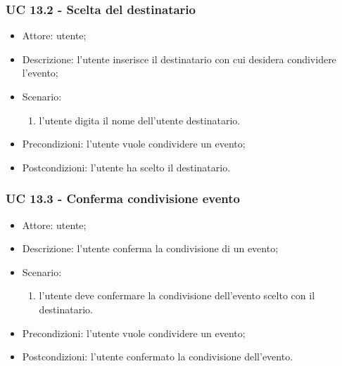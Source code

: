 \subsubsection{UC 13.2 - Scelta del destinatario} \label{sec: UC 13.2}
\begin{itemize}
    \item Attore: utente;
    \item Descrizione: l'utente inserisce il destinatario con cui desidera condividere l'evento;
    \item Scenario:
        \begin{enumerate}
        \item l'utente digita il nome dell'utente destinatario.
        \end{enumerate}
    
    \item Precondizioni: l'utente vuole condividere un evento;
    \item Postcondizioni: l'utente ha scelto il destinatario.
\end{itemize}


\subsubsection{UC 13.3 - Conferma condivisione evento} \label{sec: UC 13.3}
\begin{itemize}
    \item Attore: utente;
    \item Descrizione: l'utente conferma la condivisione di un evento;
    \item Scenario:
        \begin{enumerate}
        \item l'utente deve confermare la condivisione dell'evento scelto con il destinatario.
        \end{enumerate}
    
    \item Precondizioni: l'utente vuole condividere un evento;
    \item Postcondizioni: l'utente confermato la condivisione dell'evento.
\end{itemize}

